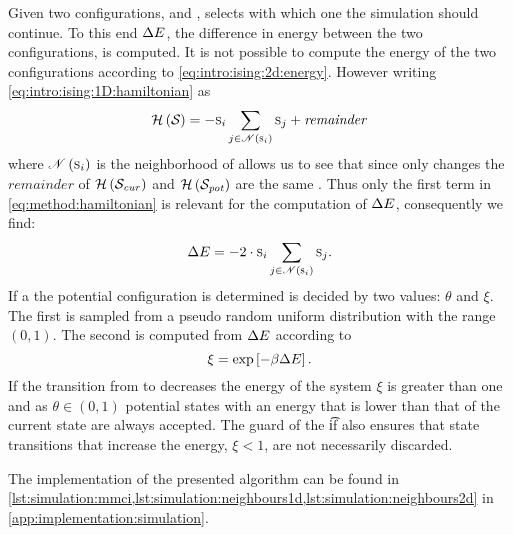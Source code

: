 Given two configurations,  and ,  selects with which one the simulation should continue. To this end $\Delta E$, the difference in energy between the two configurations, is computed. It is not possible to compute the energy of the two configurations according to \cref{eq:intro:ising:2d:energy}. However writing \cref{eq:intro:ising:1D:hamiltonian} as
	\begin{equation}\label{eq:method:hamiltonian}
			\mathcal{H}\left(\mathcal{S}_{}\right) = - \textsc{s}_{i} \sum_{j \in \mathscr{N}\left(\textsc{s}_{i}\right)} \textsc{s}_{j} + \mathit{remainder}
	\end{equation}
where $\mathscr{N}\left(\textsc{s}_{i}\right)$ is the neighborhood of  allows us to see that since only  changes the $\mathit{remainder}$ of $\mathcal{H}\left(\mathcal{S}_{\mathit{cur}}\right)$ and $\mathcal{H}\left(\mathcal{S}_{\mathit{pot}}\right)$ are the same \cite{kenzel1997physics}. Thus only the first term in \cref{eq:method:hamiltonian} is relevant for the computation of $\Delta E$, consequently we find:
\begin{equation}\label{eq:method:deltaEnergy}
	\Delta E = - 2 \cdot \textsc{s}_{i} \sum_{j \in \mathscr{N}\left(\textsc{s}_{i}\right)} \textsc{s}_{j}.
\end{equation}
If a the potential configuration is determined is decided by two values: $\theta$ and $\xi$. The first is sampled from a pseudo random uniform distribution with the range $\left(0, 1\right)$. The second is computed from $\Delta E$ according to
\begin{equation}
	\xi = \exp\left[- \beta\Delta E \right].
\end{equation}
If the transition from  to  decreases the energy of the system $\xi$ is greater than one and as \mbox{$\theta \in \left(0, 1\right)$} potential states with an energy that is lower than that of the current state are always accepted. The guard of the \t{if} also ensures that state transitions that increase the energy, \ie \mbox{$\xi < 1$}, are not necessarily discarded.

The implementation of the presented algorithm can be found in \cref{lst:simulation:mmci,lst:simulation:neighbours1d,lst:simulation:neighbours2d} in \cref{app:implementation:simulation}.